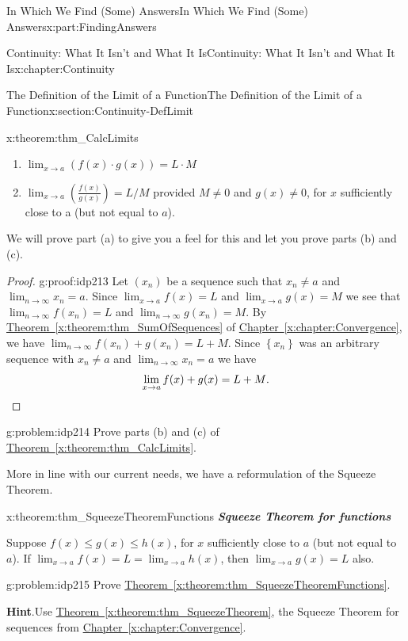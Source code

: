 \documentclass[oneside,10pt,]{book}
\newcommand{\blocktitlefont}{\relax}
\newcommand{\xreffont}{\relax}
\newcommand{\alert}[1]{\textbf{\textit{#1}}}
\numberwithin{equation}{section}
\newcommand{\qedhere}{\relax}
\def\limit#1#2#3{{\displaystyle\lim_{#1\rightarrow #2}#3}}
\begin{document}
\begin{partptx}{In Which We Find (Some) Answers}{}{In Which We Find (Some) Answers}{}{}{x:part:FindingAnswers}
\begin{chapterptx}{Continuity: What It Isn't and What It Is}{}{Continuity: What It Isn't and What It Is}{}{}{x:chapter:Continuity}
\begin{sectionptx}{The Definition of the Limit of a Function}{}{The Definition of the Limit of a Function}{}{}{x:section:Continuity-DefLimit}
\begin{theorem}{}{}{x:theorem:thm_CalcLimits}
\begin{enumerate}[label=(\alph*)]
\item{}\(\displaystyle \limit{x}{a}{\left(f(x)\cdot g(x)\right)}=L\cdot M\)%
\item{}\(\limit{x}{a}{\left(\frac{f(x)}{g(x)}\right)}=L/M\) provided \(M\ne0\) and \(g(x)\ne{}0\), for \(x\) sufficiently close to a (but not equal to \(a\)).%
\end{enumerate}
%
\end{theorem}
We will prove part (a) to give you a feel for this and let you prove parts (b) and (c).%
\begin{proof}{}{g:proof:idp213}
Let \(\left(x_n\right)\) be a sequence such that \(x_n\ne
a\) and \(\limit{n}{\infty}{x_n}=a\).  Since \(\limit{x}{a}{f(x)} = L\) and \(\limit{x}{a}{g(x)} =
M\) we see that \(\limit{n}{\infty}{f(x_n)} = L\) and \(\limit{n}{\infty}{g(x_n)} = M\).  By \hyperref[x:theorem:thm_SumOfSequences]{Theorem~{\xreffont\ref{x:theorem:thm_SumOfSequences}}} of \hyperref[x:chapter:Convergence]{Chapter~{\xreffont\ref{x:chapter:Convergence}}}, we have \(\limit{n}{\infty}{f(x_n)+g(x_n)}=L+M\).  Since \(\left\{x_n\right\}\) was an arbitrary sequence with \(x_n\ne a\) and \(\limit{n}{\infty}{x_n} = a\) we have%
\begin{equation*}
\limit{x}{a}{f(x)+g(x)} = L+M\text{.}\qedhere
\end{equation*}
%
\end{proof}
\begin{problem}{}{g:problem:idp214}%
 Prove parts (b) and (c) of \hyperref[x:theorem:thm_CalcLimits]{Theorem~{\xreffont\ref{x:theorem:thm_CalcLimits}}}.%
\end{problem}
More in line with our current needs, we have a reformulation of the Squeeze Theorem.%
\begin{theorem}{}{}{x:theorem:thm_SqueezeTheoremFunctions}%
\alert{Squeeze Theorem for functions}%
\par
{} Suppose \(f(x)\le g(x) \le h(x)\), for \(x\) sufficiently close to \(a\) (but not equal to \(a\)). If \(\limit{x}{a}{f(x)}=L=\limit{x}{a}{h(x)}\), then \(\limit{x}{a}{g(x)}=L\) also.%
\end{theorem}
\begin{problem}{}{g:problem:idp215}%
 Prove \hyperref[x:theorem:thm_SqueezeTheoremFunctions]{Theorem~{\xreffont\ref{x:theorem:thm_SqueezeTheoremFunctions}}}.%
\par\smallskip%
\noindent\textbf{\blocktitlefont Hint}.\hypertarget{g:hint:idp216}{}\quad{}Use \hyperref[x:theorem:thm_SqueezeTheorem]{Theorem~{\xreffont\ref{x:theorem:thm_SqueezeTheorem}}}, the Squeeze Theorem for sequences from \hyperref[x:chapter:Convergence]{Chapter~{\xreffont\ref{x:chapter:Convergence}}}.%

\end{problem}
\end{sectionptx}
\end{chapterptx}
\end{partptx}
\end{document}
